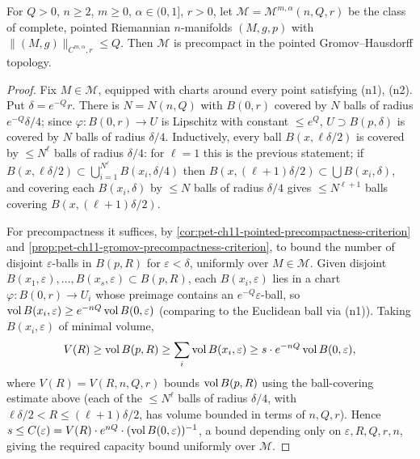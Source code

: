 \begin{lemma}
  \label{lem:pet-ch11-fundamental-thm-precompact-gh}
  For $Q>0$, $n\ge2$, $m\ge0$, $\alpha\in(0,1]$, $r>0$, let
  $\mathcal{M}=\mathcal{M}^{m,\alpha}(n,Q,r)$ be the class of complete,
  pointed Riemannian $n$-manifolds $(M,g,p)$ with
  $\|(M,g)\|_{C^{m,\alpha},r}\le Q$. Then $\mathcal{M}$ is precompact in the
  pointed Gromov--Hausdorff topology.
\end{lemma}
\begin{proof}
  Fix $M\in\mathcal{M}$, equipped with charts around every point satisfying
  (n1), (n2). Put $\delta=e^{-Q}r$. There is $N=N(n,Q)$ with $B(0,r)$
  covered by $N$ balls of radius $e^{-Q}\delta/4$; since $\varphi:B(0,r)\to U$
  is Lipschitz with constant $\le e^Q$, $U\supset B(p,\delta)$ is covered by
  $N$ balls of radius $\delta/4$. Inductively, every ball
  $B(x,\ell\delta/2)$ is covered by $\le N^\ell$ balls of radius $\delta/4$:
  for $\ell=1$ this is the previous statement; if
  $B(x,\ell\delta/2)\subset\bigcup_{i=1}^{N^\ell}B(x_i,\delta/4)$ then
  $B(x,(\ell+1)\delta/2)\subset\bigcup B(x_i,\delta)$, and covering each
  $B(x_i,\delta)$ by $\le N$ balls of radius $\delta/4$ gives $\le N^{\ell+1}$
  balls covering $B(x,(\ell+1)\delta/2)$.

  For precompactness it suffices, by
  \cref{cor:pet-ch11-pointed-precompactness-criterion} and
  \cref{prop:pet-ch11-gromov-precompactness-criterion}, to bound the number
  of disjoint $\varepsilon$-balls in $B(p,R)$ for $\varepsilon<\delta$,
  uniformly over $M\in\mathcal{M}$. Given disjoint
  $B(x_1,\varepsilon),\dots,B(x_s,\varepsilon)\subset B(p,R)$, each
  $B(x_i,\varepsilon)$ lies in a chart $\varphi:B(0,r)\to U_i$ whose preimage
  contains an $e^{-Q}\varepsilon$-ball, so
  $\operatorname{vol} B(x_i,\varepsilon)\ge e^{-nQ}\operatorname{vol} B(0,\varepsilon)$ (comparing to the
  Euclidean ball via (n1)). Taking $B(x_i,\varepsilon)$ of minimal volume,
  \[
    V(R)\ge\operatorname{vol} B(p,R)\ge\sum_i\operatorname{vol} B(x_i,\varepsilon)\ge s\cdot e^{-nQ}\operatorname{vol} B(0,\varepsilon),
  \]
  where $V(R)=V(R,n,Q,r)$ bounds $\operatorname{vol} B(p,R)$ using the ball-covering
  estimate above (each of the $\le N^\ell$ balls of radius $\delta/4$, with
  $\ell\delta/2<R\le(\ell+1)\delta/2$, has volume bounded in terms of $n,Q,r$).
  Hence $s\le C(\varepsilon)=V(R)\cdot e^{nQ}\cdot(\operatorname{vol} B(0,\varepsilon))^{-1}$,
  a bound depending only on $\varepsilon,R,Q,r,n$, giving the required
  capacity bound uniformly over $\mathcal{M}$.
\end{proof}

